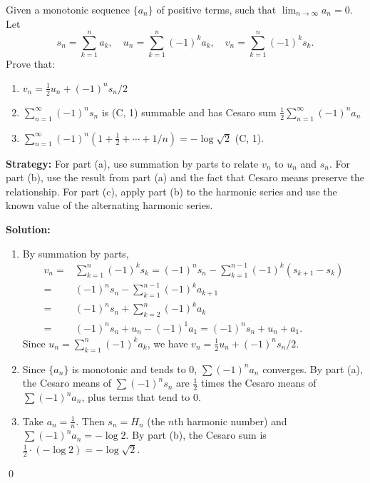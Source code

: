 \begin{problembox}
\begin{problemstatement}
Given a monotonic sequence \(\{a_n\}\) of positive terms, such that \(\lim_{n \to \infty} a_n = 0\). Let
\[s_n = \sum_{k=1}^{n} a_k, \quad u_n = \sum_{k=1}^{n} (-1)^k a_k, \quad v_n = \sum_{k=1}^{n} (-1)^k s_k.\]
Prove that:
\begin{enumerate}[label=\alph*)]
\item \(v_n = \frac{1}{2} u_n + (-1)^n s_n / 2\)
\item \(\sum_{n=1}^{\infty} (-1)^n s_n\) is (C, 1) summable and has Cesaro sum \(\frac{1}{2} \sum_{n=1}^{\infty} (-1)^n a_n\)
\item \(\sum_{n=1}^{\infty} (-1)^n (1 + \frac{1}{2} + \cdots + 1/n) = -\log \sqrt{2}\) (C, 1).
\end{enumerate}
\end{problemstatement}
\end{problembox}

\noindent\textbf{Strategy:} For part (a), use summation by parts to relate \(v_n\) to \(u_n\) and \(s_n\). For part (b), use the result from part (a) and the fact that Cesaro means preserve the relationship. For part (c), apply part (b) to the harmonic series and use the known value of the alternating harmonic series.

\bigskip\noindent\textbf{Solution:}
\begin{enumerate}[label=(\alph*)]
\item By summation by parts, 
\begin{align*}
v_n =& \sum_{k=1}^n (-1)^k s_k = (-1)^n s_n - \sum_{k=1}^{n-1} (-1)^k (s_{k+1} - s_k) \\
=& (-1)^n s_n - \sum_{k=1}^{n-1} (-1)^k a_{k+1} \\
=& (-1)^n s_n + \sum_{k=2}^n (-1)^k a_k \\
=& (-1)^n s_n + u_n - (-1)^1 a_1 = (-1)^n s_n + u_n + a_1.
\end{align*}
Since \(u_n = \sum_{k=1}^n (-1)^k a_k\), we have \(v_n = \frac{1}{2} u_n + (-1)^n s_n / 2\).

\item Since \(\{a_n\}\) is monotonic and tends to 0, \(\sum (-1)^n a_n\) converges. By part (a), the Cesaro means of \(\sum (-1)^n s_n\) are \(\frac{1}{2}\) times the Cesaro means of \(\sum (-1)^n a_n\), plus terms that tend to 0.

\item Take \(a_n = \frac{1}{n}\). Then \(s_n = H_n\) (the \(n\)th harmonic number) and \(\sum (-1)^n a_n = -\log 2\). By part (b), the Cesaro sum is \(\frac{1}{2} \cdot (-\log 2) = -\log \sqrt{2}\).
\end{enumerate}\qed

